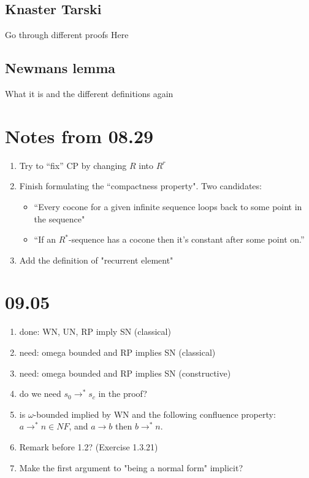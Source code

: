 \documentclass{scrartcl}
\begin{document}
\subsection{Knaster Tarski}
Go through different proofs Here

\subsection{Newmans lemma}
What it is and the different definitions again

\subsection{}

\section{Notes from 08.29}

\begin{enumerate}
  \item Try to ``fix'' CP by changing $R$ into $R^r$
  \item Finish formulating the ``compactness property".  Two candidates:
  \begin{itemize}
    \item ``Every cocone for a given infinite sequence loops back to some point in the sequence"
    \item ``If an $R^*$-sequence has a cocone then it's constant after some point on.''
  \end{itemize}
  \item Add the definition of "recurrent element"
\end{enumerate}

\section{09.05}
\begin{enumerate}
  \item done: WN, UN, RP imply SN (classical)
  \item need: omega bounded and RP implies SN (classical)
  \item need: omega bounded and RP implies SN (constructive)
  \item do we need $s_0 \to^* s_c$ in the proof?
  \item is $\omega$-bounded implied by WN and the following confluence property:
  $a \to^* n \in NF$, and $a \to b$ then $b \to^* n $.
  \item Remark before 1.2? (Exercise 1.3.21)
  \item Make the first argument to "being a normal form" implicit?
\end{enumerate}
\end{document}
